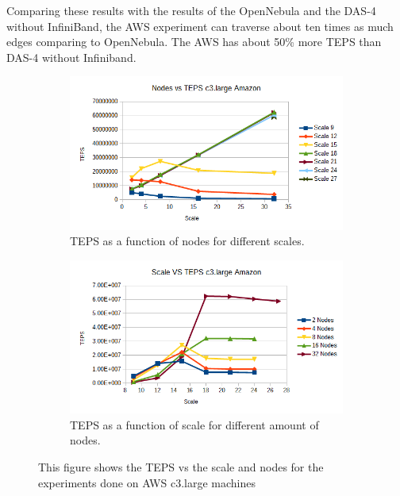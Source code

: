 Comparing these results with the results of the OpenNebula and the DAS-4 without InfiniBand, the AWS experiment can traverse about ten times as much edges comparing to OpenNebula. The AWS has about 50\% more TEPS than DAS-4 without Infiniband.
\begin{figure}[!h]
	\centering
	\begin{subfigure}{.5\textwidth}
		\centering
		\includegraphics[width=\linewidth]{images/nodes_c3_amazon.png}
		\caption{TEPS as a function of nodes for different scales.}
		\label{fig:nodes_c3_amazon}
	\end{subfigure}%
	\begin{subfigure}{.5\textwidth}
		\centering
		\includegraphics[width=\linewidth]{images/scale_c3_amazon.png}
		\caption{TEPS as a function of scale for different amount of nodes.}
		\label{fig:scale_c3_amazon}
	\end{subfigure}
	\caption{This figure shows the TEPS vs the scale and nodes for the experiments done on AWS c3.large machines}
	\label{fig:c3_amazon}
\end{figure}

